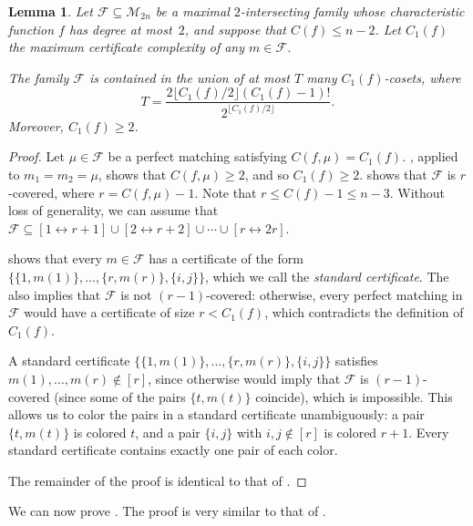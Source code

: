 \documentclass[10pt,a4paper]{amsart}
\newtheorem{lemma}[theorem]{Lemma}
\theoremstyle{definition}
\providecommand{\dcoset}[2]{[#1 \leftrightarrow #2]}
\providecommand{\cM}{\mathcal{M}}
\begin{document}
\begin{lemma} \label{lem:main-ub-pms}
Let $\mathcal{F} \subseteq \cM_{2n}$ be a maximal $2$-intersecting family whose characteristic function $f$ has degree at most~$2$, and suppose that $C(f) \leq n-2$. Let $C_1(f)$ the maximum certificate complexity of any $m \in \mathcal{F}$.

The family $\mathcal{F}$ is contained in the union of at most $T$ many $C_1(f)$-cosets, where
\[
 T = \frac{2\lfloor C_1(f)/2 \rfloor (C_1(f) - 1)!}{2^{\lfloor C_1(f)/2 \rfloor}}.
\]
Moreover, $C_1(f) \geq 2$.
\end{lemma}
\begin{proof}
Let $\mu \in \mathcal{F}$ be a perfect matching satisfying $C(f,\mu) = C_1(f)$. , applied to $m_1 = m_2 = \mu$, shows that $C(f,\mu) \geq 2$, and so $C_1(f) \geq 2$.  shows that $\mathcal{F}$ is $r$-covered, where $r = C(f,\mu) - 1$. Note that $r \leq C(f) - 1 \leq n - 3$. Without loss of generality, we can assume that $\mathcal{F} \subseteq \dcoset{1}{r+1} \cup \dcoset{2}{r+2} \cup \cdots \cup \dcoset{r}{2r}$.

 shows that every $m \in \mathcal{F}$ has a certificate of the form $\bigl\{\{1,m(1)\},\ldots,\{r,m(r)\},\{i,j\}\bigr\}$, which we call the \emph{standard certificate}. The  also implies that $\mathcal{F}$ is not $(r-1)$-covered: otherwise, every perfect matching in $\mathcal{F}$ would have a certificate of size $r < C_1(f)$, which contradicts the definition of $C_1(f)$.

A standard certificate $\bigl\{\{1,m(1)\},\ldots,\{r,m(r)\},\{i,j\}\bigr\}$ satisfies $m(1),\ldots,m(r) \notin [r]$, since otherwise  would imply that $\mathcal{F}$ is $(r-1)$-covered (since some of the pairs $\{t,m(t)\}$ coincide), which is impossible. This allows us to color the pairs in a standard certificate unambiguously: a pair $\{t,m(t)\}$ is colored $t$, and a pair $\{i,j\}$ with $i,j \notin [r]$ is colored $r+1$. Every standard certificate contains exactly one pair of each color.

The remainder of the proof is identical to that of .
\end{proof}

We can now prove . The proof is very similar to that of .
\end{document}
